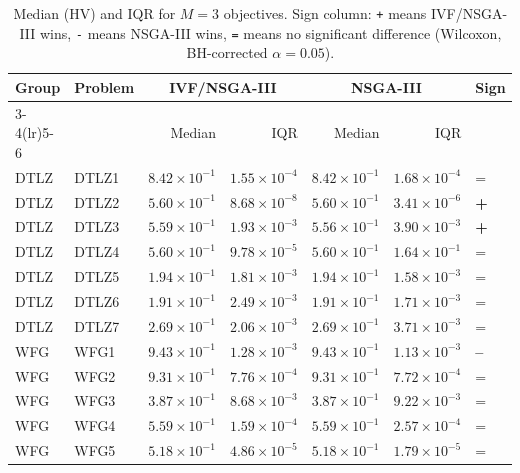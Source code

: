 \begin{table}[t]
\centering
\caption{Median (HV) and IQR for $M=3$ objectives. Sign column: \texttt{+} means IVF/NSGA-III wins, \texttt{-} means NSGA-III wins, \texttt{=} means no significant difference (Wilcoxon, BH-corrected $\alpha=0.05$).}
\label{tab:hv_m3_ivfnsga-iii}
\scriptsize
\begin{tabular}{llrrrrl}
\toprule
Group & Problem & \multicolumn{2}{c}{IVF/NSGA-III} & \multicolumn{2}{c}{NSGA-III} & Sign \\
\cmidrule(lr){3-4}\cmidrule(lr){5-6}
 & & Median & IQR & Median & IQR & \\
\midrule
DTLZ & DTLZ1 & $8.42\!\times\!10^{-1}$ & $1.55\!\times\!10^{-4}$ & $8.42\!\times\!10^{-1}$ & $1.68\!\times\!10^{-4}$ & = \\
DTLZ & DTLZ2 & $5.60\!\times\!10^{-1}$ & $8.68\!\times\!10^{-8}$ & $5.60\!\times\!10^{-1}$ & $3.41\!\times\!10^{-6}$ & \textbf{+} \\
DTLZ & DTLZ3 & $5.59\!\times\!10^{-1}$ & $1.93\!\times\!10^{-3}$ & $5.56\!\times\!10^{-1}$ & $3.90\!\times\!10^{-3}$ & \textbf{+} \\
DTLZ & DTLZ4 & $5.60\!\times\!10^{-1}$ & $9.78\!\times\!10^{-5}$ & $5.60\!\times\!10^{-1}$ & $1.64\!\times\!10^{-1}$ & = \\
DTLZ & DTLZ5 & $1.94\!\times\!10^{-1}$ & $1.81\!\times\!10^{-3}$ & $1.94\!\times\!10^{-1}$ & $1.58\!\times\!10^{-3}$ & = \\
DTLZ & DTLZ6 & $1.91\!\times\!10^{-1}$ & $2.49\!\times\!10^{-3}$ & $1.91\!\times\!10^{-1}$ & $1.71\!\times\!10^{-3}$ & = \\
DTLZ & DTLZ7 & $2.69\!\times\!10^{-1}$ & $2.06\!\times\!10^{-3}$ & $2.69\!\times\!10^{-1}$ & $3.71\!\times\!10^{-3}$ & = \\
\addlinespace
WFG & WFG1 & $9.43\!\times\!10^{-1}$ & $1.28\!\times\!10^{-3}$ & $9.43\!\times\!10^{-1}$ & $1.13\!\times\!10^{-3}$ & \textbf{--} \\
WFG & WFG2 & $9.31\!\times\!10^{-1}$ & $7.76\!\times\!10^{-4}$ & $9.31\!\times\!10^{-1}$ & $7.72\!\times\!10^{-4}$ & = \\
WFG & WFG3 & $3.87\!\times\!10^{-1}$ & $8.68\!\times\!10^{-3}$ & $3.87\!\times\!10^{-1}$ & $9.22\!\times\!10^{-3}$ & = \\
WFG & WFG4 & $5.59\!\times\!10^{-1}$ & $1.59\!\times\!10^{-4}$ & $5.59\!\times\!10^{-1}$ & $2.57\!\times\!10^{-4}$ & = \\
WFG & WFG5 & $5.18\!\times\!10^{-1}$ & $4.86\!\times\!10^{-5}$ & $5.18\!\times\!10^{-1}$ & $1.79\!\times\!10^{-5}$ & = \\

\end{tabular}
\end{table}

